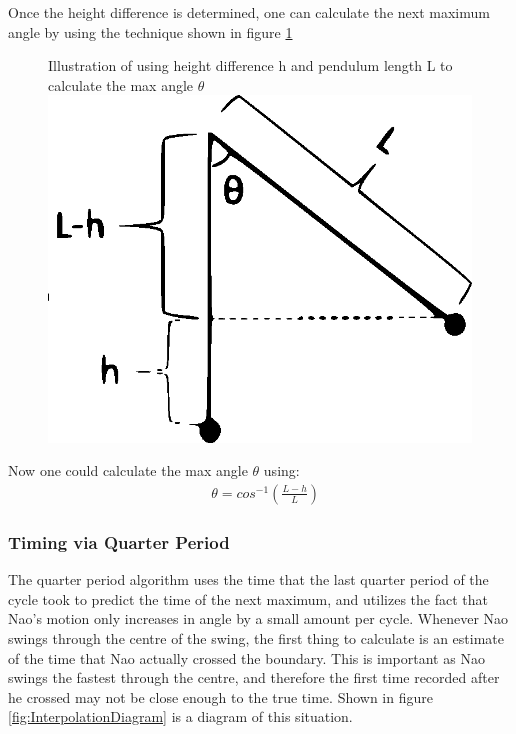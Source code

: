 \documentclass[11pt]{article}
\newcommand*\ruleline[1]{\par\noindent\raisebox{.8ex}{\makebox[\linewidth]{\hrulefill\hspace{1ex}\raisebox{-.8ex}{#1}\hspace{1ex}\hrulefill}}}
\begin{document}
Once the height difference is determined, one can calculate the next maximum angle by using the technique shown in figure \ref{fig:max_angle_calculation}

    \begin{figure}[!htb]
        \centering
        \captionbox
             {Illustration of using height difference h and pendulum length L to calculate the max angle $\theta$\label{fig:max_angle_calculation}}
             {\includegraphics[scale = 0.85]{max_angle_calculation.eps}}
    \end{figure}
    
Now one could calculate the max angle $\theta$ using:
\begin{align}
    &\theta = cos^{-1}(\frac{L-h}{L})
\end{align}





\subsubsection{Timing via Quarter Period}
\ruleline{George Sheppard}
The quarter period algorithm uses the time that the last quarter period of the cycle took to predict the time of the next maximum, and utilizes the fact that Nao's motion only increases in angle by a small amount per cycle. Whenever Nao swings through the centre of the swing, the first thing to calculate is an estimate of the time that Nao actually crossed the boundary. This is important as Nao swings the fastest through the centre, and therefore the first time recorded after he crossed may not be close enough to the true time. Shown in figure \ref{fig:InterpolationDiagram} is a diagram of this situation. 
\end{document}
